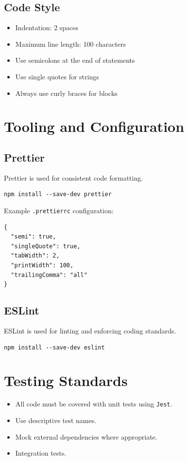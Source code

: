 \documentclass[a4paper,12pt]{article}
\begin{document}
\subsection{Code Style}
\begin{itemize}
\item Indentation: 2 spaces
\item Maximum line length: 100 characters
\item Use semicolons at the end of statements
\item Use single quotes for strings
\item Always use curly braces for blocks
\end{itemize}

\section{Tooling and Configuration}

\subsection{Prettier}
Prettier is used for consistent code formatting.
\begin{verbatim}
npm install --save-dev prettier
\end{verbatim}

Example \texttt{.prettierrc} configuration:
\begin{verbatim}
{
  "semi": true,
  "singleQuote": true,
  "tabWidth": 2,
  "printWidth": 100,
  "trailingComma": "all"
}
\end{verbatim}

\subsection{ESLint}
ESLint is used for linting and enforcing coding standards.
\begin{verbatim}
npm install --save-dev eslint
\end{verbatim}

\section{Testing Standards}
\begin{itemize}
\item All code must be covered with unit tests using \texttt{Jest}.
\item Use descriptive test names.
\item Mock external dependencies where appropriate.
\item Integration tests.
\end{itemize}
\end{document}
